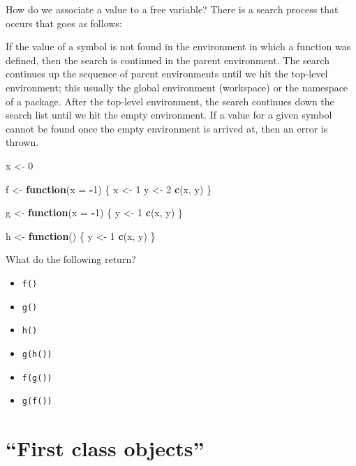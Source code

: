 \documentclass[]{book}
\newenvironment{Shaded}{\begin{snugshade}}{\end{snugshade}}
\newcommand{\KeywordTok}[1]{\textcolor[rgb]{0.13,0.29,0.53}{\textbf{#1}}}
\newcommand{\DataTypeTok}[1]{\textcolor[rgb]{0.13,0.29,0.53}{#1}}
\newcommand{\DecValTok}[1]{\textcolor[rgb]{0.00,0.00,0.81}{#1}}
\newcommand{\StringTok}[1]{\textcolor[rgb]{0.31,0.60,0.02}{#1}}
\newcommand{\ControlFlowTok}[1]{\textcolor[rgb]{0.13,0.29,0.53}{\textbf{#1}}}
\newcommand{\OperatorTok}[1]{\textcolor[rgb]{0.81,0.36,0.00}{\textbf{#1}}}
\newcommand{\NormalTok}[1]{#1}
\providecommand{\tightlist}{%
  \setlength{\itemsep}{0pt}\setlength{\parskip}{0pt}}
\begin{document}
How do we associate a value to a free variable? There is a search
process that occurs that goes as follows:

If the value of a symbol is not found in the environment in which a
function was defined, then the search is continued in the parent
environment. The search continues up the sequence of parent environments
until we hit the top-level environment; this usually the global
environment (workspace) or the namespace of a package. After the
top-level environment, the search continues down the search list until
we hit the empty environment. If a value for a given symbol cannot be
found once the empty environment is arrived at, then an error is thrown.

\begin{Shaded}
\begin{Highlighting}[]
\NormalTok{x <-}\StringTok{ }\DecValTok{0}

\NormalTok{f <-}\StringTok{ }\ControlFlowTok{function}\NormalTok{(}\DataTypeTok{x =} \OperatorTok{-}\DecValTok{1}\NormalTok{) \{}
\NormalTok{  x <-}\StringTok{ }\DecValTok{1}
\NormalTok{  y <-}\StringTok{ }\DecValTok{2}
  \KeywordTok{c}\NormalTok{(x, y)}
\NormalTok{\}}

\NormalTok{g <-}\StringTok{ }\ControlFlowTok{function}\NormalTok{(}\DataTypeTok{x =} \OperatorTok{-}\DecValTok{1}\NormalTok{) \{}
\NormalTok{  y <-}\StringTok{ }\DecValTok{1}
  \KeywordTok{c}\NormalTok{(x, y)}
\NormalTok{\}}

\NormalTok{h <-}\StringTok{ }\ControlFlowTok{function}\NormalTok{() \{}
\NormalTok{  y <-}\StringTok{ }\DecValTok{1}
  \KeywordTok{c}\NormalTok{(x, y)}
\NormalTok{\}}
\end{Highlighting}
\end{Shaded}

What do the following return?

\begin{itemize}
\tightlist
\item
  \texttt{f()}
\item
  \texttt{g()}
\item
  \texttt{h()}
\item
  \texttt{g(h())}
\item
  \texttt{f(g())}
\item
  \texttt{g(f())}
\end{itemize}

\section{\texorpdfstring{``First class
objects''}{First class objects}}\label{first-class-objects}
\end{document}
